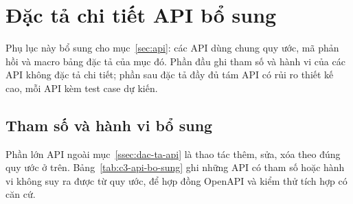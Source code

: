 \section{Đặc tả chi tiết API bổ sung}\label{pl:dac-ta-api}

Phụ lục này bổ sung cho mục~\ref{sec:api}: các API dùng chung quy ước, mã phản hồi và macro bảng đặc tả của mục đó. Phần đầu ghi tham số và hành vi của các API không đặc tả chi tiết; phần sau đặc tả đầy đủ tám API có rủi ro thiết kế cao, mỗi API kèm test case dự kiến.

\subsection{Tham số và hành vi bổ sung}\label{pl:api-bo-sung}

Phần lớn API ngoài mục~\ref{ssec:dac-ta-api} là thao tác thêm, sửa, xóa theo đúng quy ước ở trên. Bảng~\ref{tab:c3-api-bo-sung} ghi những API có tham số hoặc hành vi không suy ra được từ quy ước, để hợp đồng OpenAPI và kiểm thử tích hợp có căn cứ.

